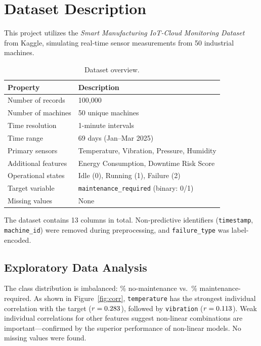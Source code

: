 \documentclass[11pt]{article}
\begin{document}
\section{Dataset Description}

This project utilizes the \textit{Smart Manufacturing IoT-Cloud Monitoring Dataset} from Kaggle, simulating real-time sensor measurements from 50 industrial machines.

\begin{table}[H]
\centering
\caption{Dataset overview.}
\label{tab:dataset}
\begin{tabular}{ll}
\toprule
\textbf{Property} & \textbf{Description} \\
\midrule
Number of records & 100,000 \\
Number of machines & 50 unique machines \\
Time resolution & 1-minute intervals \\
Time range & 69 days (Jan--Mar 2025) \\
Primary sensors & Temperature, Vibration, Pressure, Humidity \\
Additional features & Energy Consumption, Downtime Risk Score \\
Operational states & Idle (0), Running (1), Failure (2) \\
Target variable & \texttt{maintenance\_required} (binary: 0/1) \\
Missing values & None \\
\bottomrule
\end{tabular}
\end{table}

The dataset contains 13 columns in total. Non-predictive identifiers (\texttt{timestamp}, \texttt{machine\_id}) were removed during preprocessing, and \texttt{failure\_type} was label-encoded.

\subsection{Exploratory Data Analysis}

The class distribution is imbalanced: \noMaintPct\% no-maintenance vs.\ \maintPct\% maintenance-required. As shown in Figure~\ref{fig:corr}, \texttt{temperature} has the strongest individual correlation with the target ($r = 0.283$), followed by \texttt{vibration} ($r = 0.113$). Weak individual correlations for other features suggest non-linear combinations are important---confirmed by the superior performance of non-linear models. No missing values were found.
\end{document}
